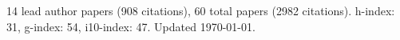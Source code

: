 14 lead author papers (908 citations),
60 total papers (2982 citations).\newline
h-index: 31, g-index: 54, i10-index: 47. Updated \today.